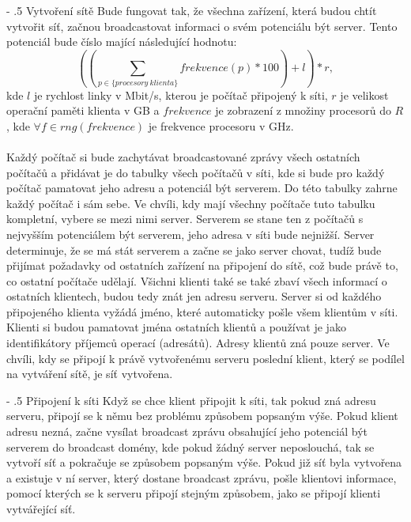 \documentclass[12pt]{article}
\makeatletter
\renewcommand\paragraph{%
    \@startsection{paragraph}{4}{0mm}%
       {-\baselineskip}%
       {.5\baselineskip}%
       {\normalfont\normalsize\bfseries}}
\makeatother
\begin{document}
\paragraph{Vytvoření sítě} 
Bude fungovat tak, že všechna zařízení, která budou chtít vytvořit síť, začnou broadcastovat informaci o svém potenciálu být server. Tento potenciál bude číslo mající následující hodnotu:
$$((\sum_{p \in \{procesory\ klienta\}} frekvence(p) * 100) + l) * r ,$$ 
kde $l$ je rychlost linky v Mbit/s, kterou je počítač připojený k síti, $r$ je velikost operační paměti klienta v GB a $frekvence$ je zobrazení z množiny procesorů do $R$, kde $\forall f \in rng(frekvence)$ je frekvence procesoru v GHz.\\\\
Každý počítač si bude zachytávat broadcastované zprávy všech ostatních počítačů a přidávat je do tabulky všech počítačů v síti, kde si bude pro každý počítač pamatovat jeho adresu a potenciál být serverem. Do této tabulky zahrne každý počítač i sám sebe. Ve chvíli, kdy mají všechny počítače tuto tabulku kompletní, vybere se mezi nimi server. Serverem se stane ten z počítačů s nejvyšším potenciálem být serverem, jeho adresa v síti bude nejnižší. Server determinuje, že se má stát serverem a začne se jako server chovat, tudíž bude přijímat požadavky od ostatních zařízení na připojení do sítě, což bude právě to, co ostatní počítače udělají. Všichni klienti také se také zbaví všech informací o ostatních klientech, budou tedy znát jen adresu serveru. Server si od každého připojeného klienta vyžádá jméno, které automaticky pošle všem klientům v síti. Klienti si budou pamatovat jména ostatních klientů a používat je jako identifikátory příjemců operací (adresátů). Adresy klientů zná pouze server. Ve chvíli, kdy se připojí k právě vytvořenému serveru poslední klient, který se podílel na vytváření sítě, je síť vytvořena.

\paragraph{Připojení k síti} 
Když se chce klient připojit k síti, tak pokud zná adresu serveru, připojí se k němu bez problému způsobem popsaným výše. Pokud klient adresu nezná, začne vysílat broadcast zprávu obsahující jeho potenciál být serverem do broadcast domény, kde pokud žádný server neposlouchá, tak se vytvoří síť a pokračuje se způsobem popsaným výše. Pokud již síť byla vytvořena a existuje v ní server, který dostane broadcast zprávu, pošle klientovi informace, pomocí kterých se k serveru připojí stejným způsobem, jako se připojí klienti vytvářející síť.
\end{document}

